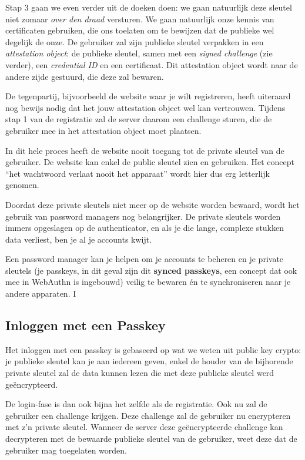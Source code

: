\documentclass[
  10pt,
  dutch,
  paper=a4,
  ,captions=tableheading
]{scrbook}
\begin{document}
Stap 3 gaan we even verder uit de doeken doen: we gaan natuurlijk deze
sleutel niet zomaar \emph{over den draad} versturen. We gaan natuurlijk
onze kennis van certificaten gebruiken, die ons toelaten om te bewijzen
dat de publieke wel degelijk de onze. De gebruiker zal zijn publieke
sleutel verpakken in een \emph{attestation object}: de publieke sleutel,
samen met een \emph{signed challenge} (zie verder), een \emph{credential
ID} en een certificaat. Dit attestation object wordt naar de andere
zijde gestuurd, die deze zal bewaren.

De tegenpartij, bijvoorbeeld de website waar je wilt registreren, heeft
uiteraard nog bewijs nodig dat het jouw attestation object wel kan
vertrouwen. Tijdens stap 1 van de registratie zal de server daarom een
challenge sturen, die de gebruiker mee in het attestation object moet
plaatsen.

In dit hele proces heeft de website nooit toegang tot de private sleutel
van de gebruiker. De website kan enkel de public sleutel zien en
gebruiken. Het concept ``het wachtwoord verlaat nooit het apparaat''
wordt hier dus erg letterlijk genomen.

\begin{warningblock}
Doordat deze private sleutels niet meer op de website worden bewaard,
wordt het gebruik van password managers nog belangrijker. De private
sleutels worden immers opgeslagen op de authenticator, en als je die
lange, complexe stukken data verliest, ben je al je accounts kwijt.

Een password manager kan je helpen om je accounts te beheren en je
private sleutels (je passkeys, in dit geval zijn dit \textbf{synced
passkeys}, een concept dat ook mee in WebAuthn is ingebouwd) veilig te
bewaren én te synchroniseren naar je andere apparaten. I
\end{warningblock}

\subsection{Inloggen met een Passkey}\label{inloggen-met-een-passkey}

Het inloggen met een passkey is gebaseerd op wat we weten uit public key
crypto: je publieke sleutel kan je aan iedereen geven, enkel de houder
van de bijhorende private sleutel zal de data kunnen lezen die met deze
publieke sleutel werd geëncrypteerd.

De login-fase is dan ook bijna het zelfde als de registratie. Ook nu zal
de gebruiker een challenge krijgen. Deze challenge zal de gebruiker nu
encrypteren met z'n private sleutel. Wanneer de server deze
geëncrypteerde challenge kan decrypteren met de bewaarde publieke
sleutel van de gebruiker, weet deze dat de gebruiker mag toegelaten
worden.
\end{document}
